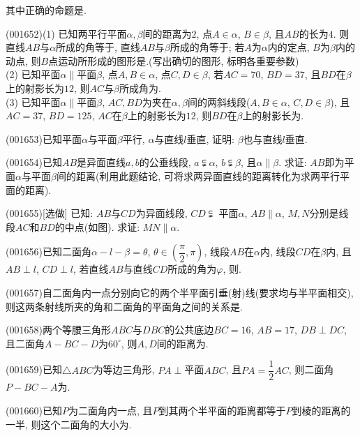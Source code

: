 其中正确的命题是.\\ 
\item (001652)(1) 已知两平行平面$\alpha,\beta$间的距离为$2$, 点$A\in \alpha$, $B\in \beta$, 且$AB$的长为$4$. 则直线$AB$与$\alpha$所成的角等于, 直线$AB$与$\beta$所成的角等于; 若$A$为$\alpha$内的定点, $B$为$\beta$内的动点, 则$B$点运动所形成的图形是.(写出确切的图形, 标明各重要参数)\\ 
(2) 已知平面$\alpha\parallel$平面$\beta$, 点$A,B\in \alpha$, 点$C,D\in \beta$, 若$AC=70$, $BD=37$, 且$BD$在$\beta$上的射影长为$12$, 则$AC$与$\beta$所成角为.\\ 
(3) 已知平面$\alpha\parallel$平面$\beta$, $AC,BD$为夹在$\alpha,\beta$间的两斜线段($A,B\in \alpha$, $C,D\in \beta$), 且$AC=37$, $BD=125$, $AC$在$\beta$上的射影长为$12$, 则$BD$在$\beta$上的射影长为.
\item (001653)已知平面$\alpha$与平面$\beta$平行, $\alpha$与直线$l$垂直, 证明: $\beta$也与直线$l$垂直.
\item (001654)已知$AB$是异面直线$a,b$的公垂线段, $a\subsetneqq \alpha$, $b\subsetneqq\beta$, 且$\alpha\parallel \beta$. 求证: $AB$即为平面$\alpha$与平面$\beta$间的距离(利用此题结论, 可将求两异面直线的距离转化为求两平行平面的距离).
\item (001655)[选做]
已知: $AB$与$CD$为异面线段, $CD\subsetneqq$ 平面$\alpha$, $AB\parallel \alpha$, $M,N$分别是线段$AC$和$BD$的中点(如图). 求证: $MN\parallel \alpha$.
\item (001656)已知二面角$\alpha-l-\beta=\theta$, $\theta\in \left(\dfrac{\pi}{2},\pi\right)$, 线段$AB$在$\alpha$内, 线段$CD$在$\beta$内, 且$AB\perp l$, $CD\perp l$, 若直线$AB$与直线$CD$所成的角为$\varphi$, 则.
\item (001657)自二面角内一点分别向它的两个半平面引垂(射)线(要求均与半平面相交), 则这两条射线所夹的角和二面角的平面角之间的关系是.
\item (001658)两个等腰三角形$ABC$与$DBC$的公共底边$BC=16$, $AB=17$, $DB\perp DC$, 且二面角$A-BC-D$为$60^\circ$, 则$A,D$间的距离为.
\item (001659)已知$\triangle ABC$为等边三角形, $PA\perp $平面$ABC$, 且$PA=\dfrac{1}{2}AC$, 则二面角$P-BC-A$为.
\item (001660)已知$P$为二面角内一点, 且$P$到其两个半平面的距离都等于$P$到棱的距离的一半, 则这个二面角的大小为.
